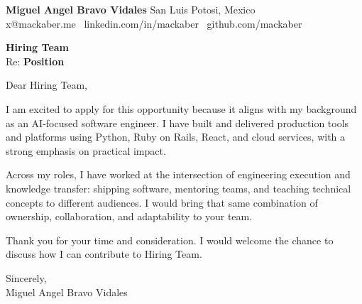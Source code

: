 \documentclass[11pt]{article}
\providecommand{\CVProfile}{ai-engineer}
\providecommand{\CompanyName}{Hiring Team}
\providecommand{\RoleTitle}{Position}
\newcommand{\ProfileSwitch}[3]{%
    \ifstrequal{\CVProfile}{academic}{#1}{%
        \ifstrequal{\CVProfile}{fullstack-engineer}{#2}{#3}%
    }%
}
\begin{document}
\textbf{Miguel Angel Bravo Vidales} \hfill San Luis Potosi, Mexico\\
x@mackaber.me \textbullet\ linkedin.com/in/mackaber \textbullet\ github.com/mackaber

\vspace{18pt}
\textbf{\CompanyName}\\
Re: \textbf{\RoleTitle}

\vspace{14pt}
Dear Hiring Team,

\vspace{12pt}
\ProfileSwitch{
I am excited to apply for this opportunity because it aligns with my background in computer science education, mentoring, and applied AI/ML work. I have taught software development and cloud fundamentals, and I enjoy connecting technical depth with clear communication in learning environments.
}{
I am excited to apply for this opportunity because it aligns with my background as a full-stack software engineer. I have delivered backend services, frontend features, and cloud-native integrations across product teams, with a strong focus on reliability and execution.
}{
I am excited to apply for this opportunity because it aligns with my background as an AI-focused software engineer. I have built and delivered production tools and platforms using Python, Ruby on Rails, React, and cloud services, with a strong emphasis on practical impact.
}

\vspace{10pt}
Across my roles, I have worked at the intersection of engineering execution and knowledge transfer: shipping software, mentoring teams, and teaching technical concepts to different audiences. I would bring that same combination of ownership, collaboration, and adaptability to your team.

\vspace{10pt}
Thank you for your time and consideration. I would welcome the chance to discuss how I can contribute to \CompanyName.

\vspace{16pt}
Sincerely,\\
Miguel Angel Bravo Vidales
\end{document}
